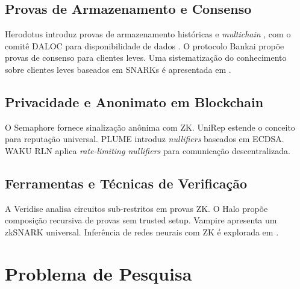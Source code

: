 \documentclass[12pt,a4paper]{article}
\begin{document}
\lipsum[18]

\subsection{Provas de Armazenamento e Consenso}

Herodotus introduz provas de armazenamento históricas e \textit{multichain}
\cite{historical_multichain_storage_proofs}, com o comitê DALOC para
disponibilidade de dados \cite{herodotus_daloc}. O protocolo Bankai
\cite{bankai} propõe provas de consenso para clientes leves. Uma
sistematização do conhecimento sobre clientes leves baseados em SNARKs
é apresentada em \cite{snark_light_clients_sok}.

\lipsum[19]

\subsection{Privacidade e Anonimato em Blockchain}

O Semaphore \cite{semaphore_whitepaper} fornece sinalização anônima
com ZK. UniRep \cite{unirep_pse_report} estende o conceito para
reputação universal. PLUME \cite{plume_ecdsa_nullifier} introduz
\textit{nullifiers} baseados em ECDSA. WAKU RLN \cite{waku_rln_relay}
aplica \textit{rate-limiting nullifiers} para comunicação descentralizada.

\lipsum[20]

\subsection{Ferramentas e Técnicas de Verificação}

A Veridise \cite{veridise_underconstrained_circuits} analisa circuitos
sub-restritos em provas ZK. O Halo \cite{halo_recursive_proof_composition}
propõe composição recursiva de provas sem trusted setup. Vampire
\cite{vampire_zksnark} apresenta um zkSNARK universal. Inferência de
redes neurais com ZK é explorada em \cite{trustless_nn_inference}.

\lipsum[21]

\section{Problema de Pesquisa}

\lipsum[22-23]
\end{document}
